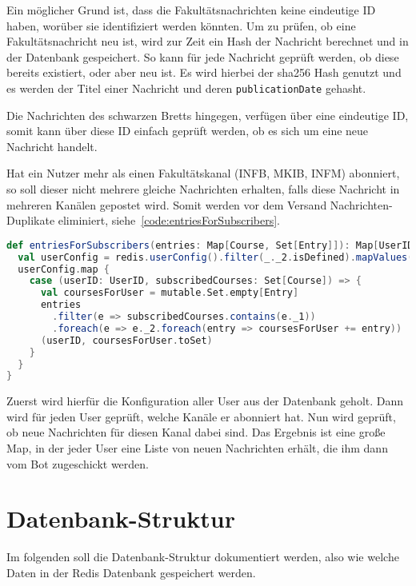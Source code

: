 Ein möglicher Grund ist, dass die Fakultätsnachrichten keine eindeutige ID haben, worüber sie identifiziert werden könnten. Um zu prüfen, ob eine Fakultätsnachricht neu ist, wird zur Zeit ein Hash der Nachricht berechnet und in der Datenbank gespeichert. So kann für jede Nachricht geprüft werden, ob diese bereits existiert, oder aber neu ist. Es wird hierbei der sha256 Hash genutzt und es werden der Titel einer Nachricht und deren \texttt{publicationDate} gehasht.

Die Nachrichten des schwarzen Bretts hingegen, verfügen über eine eindeutige ID, somit kann über diese ID einfach geprüft werden, ob es sich um eine neue Nachricht handelt.

Hat ein Nutzer mehr als einen Fakultätskanal (INFB, MKIB, INFM) abonniert, so soll dieser nicht mehrere gleiche Nachrichten erhalten, falls diese Nachricht in mehreren Kanälen gepostet wird. Somit werden vor dem Versand Nachrichten-Duplikate eliminiert, siehe~\autoref{code:entriesForSubscribers}.

\begin{lstlisting}[language=scala, style=scala, caption={Verteilung der Nachrichten auf die Subscriber und Eliminierung von Duplikaten}, label={code:entriesForSubscribers}]
def entriesForSubscribers(entries: Map[Course, Set[Entry]]): Map[UserID, Set[Entry]] = {
  val userConfig = redis.userConfig().filter(_._2.isDefined).mapValues(_.get)
  userConfig.map {
    case (userID: UserID, subscribedCourses: Set[Course]) => {
      val coursesForUser = mutable.Set.empty[Entry]
      entries
        .filter(e => subscribedCourses.contains(e._1))
        .foreach(e => e._2.foreach(entry => coursesForUser += entry))
      (userID, coursesForUser.toSet)
    }
  }
}
\end{lstlisting}

Zuerst wird hierfür die Konfiguration aller User aus der Datenbank geholt. Dann wird für jeden User geprüft, welche Kanäle er abonniert hat. Nun wird geprüft, ob neue Nachrichten für diesen Kanal dabei sind. Das Ergebnis ist eine große Map, in der jeder User eine Liste von neuen Nachrichten erhält, die ihm dann vom Bot zugeschickt werden.

\section{Datenbank-Struktur}
Im folgenden soll die Datenbank-Struktur dokumentiert werden, also wie welche Daten in der Redis Datenbank gespeichert werden.

